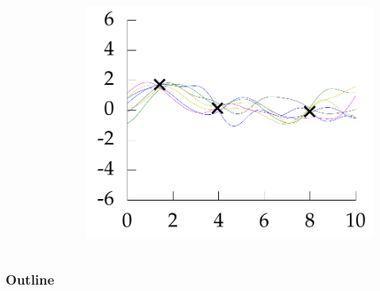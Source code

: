 \documentclass[10pt]{beamer}
\begin{document}
\begin{frame}
\begin{columns}
\begin{column}{0.33\textwidth}
\begin{figure}
        \end{figure}
      \end{column}
      \pause
      \begin{column}{0.33\textwidth}
        \begin{figure}
          \centering
          \includegraphics[width=\textwidth]{func3.png}
        \end{figure}
      \end{column}
    \end{columns}
  \end{frame}

  \begin{frame}[noframenumbering]
    \frametitle{Outline}
    \tableofcontents
  \end{frame}
\end{document}
